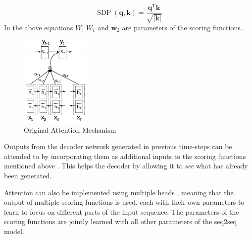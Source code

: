 \documentclass[12pt]{article}
\DeclareMathOperator{\SDP}{SDP}
\begin{document}
\begin{equation} \label{eq:sdp}
\SDP(\bm{q},\bm{k})=\frac{\bm{q}^\mathsf{T}\bm{k}}{\sqrt{|\bm{k}|}}
\end{equation}
In the above equations \(W\), \(W_1\) and \(\bm{w}_2\) are parameters of the scoring functions.
\begin{figure}[H]
	\centering
	\includegraphics[width=0.3\textwidth]{pics/bahdanau_attn.png}
	\caption{Original Attention Mechanism \cite{Bahdanau:2014}}
	\label{fig:attentiona}
\end{figure}
Outputs from the decoder network generated in previous time-steps can be attended to by incorporating them as additional inputs to the scoring functions mentioned above \cite{Shao:2017}. This helps the decoder by allowing it to \textit{see} what has already been generated.

Attention can also be implemented using multiple heads \cite{Vaswani:2017}, meaning that the output of multiple scoring functions is used, each with their own parameters to learn to focus on different parts of the input sequence. The parameters of the scoring functions are jointly learned with all other parameters of the seq2seq model.
\end{document}
